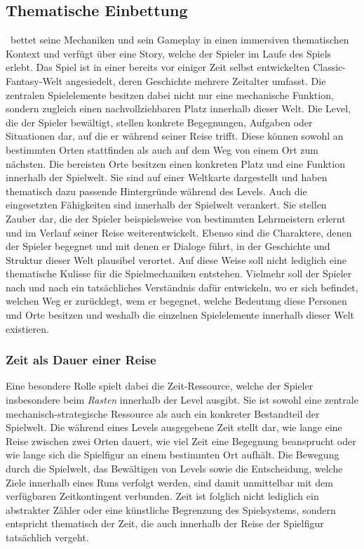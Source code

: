 \subsection{Thematische Einbettung}

\coc\ bettet seine Mechaniken und sein Gameplay in einen immersiven thematischen Kontext und verfügt über eine Story, welche der Spieler im Laufe des Spiels erlebt.
Das Spiel ist in einer bereits vor einiger Zeit selbst entwickelten Classic-Fantasy-Welt angesiedelt, deren Geschichte mehrere Zeitalter umfasst.
Die zentralen Spielelemente besitzen dabei nicht nur eine mechanische Funktion, sondern zugleich einen nachvollziehbaren Platz innerhalb dieser Welt.
Die Level, die der Spieler bewältigt, stellen konkrete Begegnungen, Aufgaben oder Situationen dar, auf die er während seiner Reise trifft.
Diese können sowohl an bestimmten Orten stattfinden als auch auf dem Weg von einem Ort zum nächsten.
Die bereisten Orte besitzen einen konkreten Platz und eine Funktion innerhalb der Spielwelt.
Sie sind auf einer Weltkarte dargestellt und haben thematisch dazu passende Hintergründe während des Levels.
Auch die eingesetzten Fähigkeiten sind innerhalb der Spielwelt verankert. Sie stellen Zauber dar, die der Spieler beispielsweise von bestimmten Lehrmeistern erlernt und im Verlauf seiner Reise weiterentwickelt.
Ebenso sind die Charaktere, denen der Spieler begegnet und mit denen er Dialoge führt, in der Geschichte und Struktur dieser Welt plausibel verortet.
Auf diese Weise soll nicht lediglich eine thematische Kulisse für die Spielmechaniken entstehen.
Vielmehr soll der Spieler nach und nach ein tatsächliches Verständnis dafür entwickeln, wo er sich befindet, welchen Weg er zurücklegt, wem er begegnet, welche Bedeutung diese Personen und Orte besitzen und weshalb die einzelnen Spielelemente innerhalb dieser Welt existieren.

\subsubsection{Zeit als Dauer einer Reise}
Eine besondere Rolle spielt dabei die Zeit-Ressource, welche der Spieler insbesondere beim \emph{Rasten} innerhalb der Level ausgibt.
Sie ist sowohl eine zentrale mechanisch-strategische Ressource als auch ein konkreter Bestandteil der Spielwelt.
Die während eines Levels ausgegebene Zeit stellt dar, wie lange eine Reise zwischen zwei Orten dauert, wie viel Zeit eine Begegnung beansprucht oder wie lange sich die Spielfigur an einem bestimmten Ort aufhält.
Die Bewegung durch die Spielwelt, das Bewältigen von Levels sowie die Entscheidung, welche Ziele innerhalb eines Runs verfolgt werden, sind damit unmittelbar mit dem verfügbaren Zeitkontingent verbunden.
Zeit ist folglich nicht lediglich ein abstrakter Zähler oder eine künstliche Begrenzung des Spielsystems, sondern entspricht thematisch der Zeit, die auch innerhalb der Reise der Spielfigur tatsächlich vergeht.

